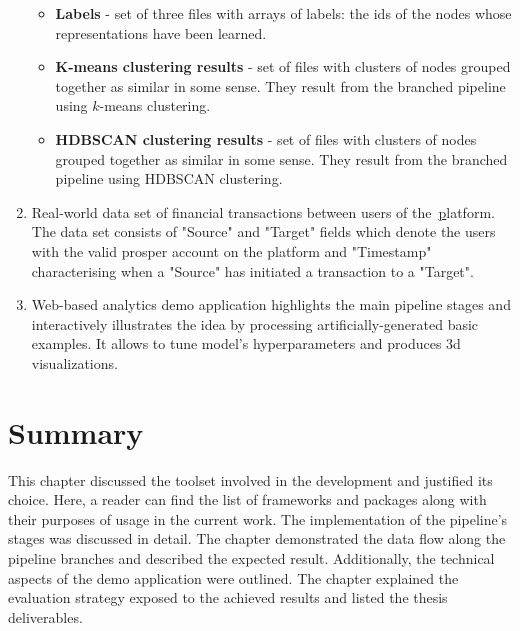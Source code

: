 \begin{enumerate}
\begin{itemize}
        \item \textbf{Labels} - set of three files with arrays of labels: the ids of the nodes whose representations have been learned.
        \item \textbf{K-means clustering results} - set of files with clusters of nodes grouped together as similar in some sense. They result from the branched pipeline using $k$-means clustering.
        \item \textbf{HDBSCAN clustering results} - set of files with clusters of nodes grouped together as similar in some sense. They result from the branched pipeline using HDBSCAN clustering.
    \end{itemize}
    \item Real-world data set of financial transactions between users of the~\href{www.prosper.com} platform. The data set consists of "Source" and "Target" fields which denote the users with the valid prosper account on the platform and "Timestamp" characterising when a "Source" has initiated a transaction to a "Target".
    \item Web-based analytics demo application highlights the main pipeline stages and interactively illustrates the idea by processing artificially-generated basic examples. It allows to tune model's hyperparameters and produces 3d visualizations.
\end{enumerate}

\section{Summary}
This chapter discussed the toolset involved in the development and justified its choice. Here, a reader can find the list of frameworks and packages along with their purposes of usage in the current work. The implementation of the pipeline's stages was discussed in detail. The chapter demonstrated the data flow along the pipeline branches and described the expected result. Additionally, the technical aspects of the demo application were outlined. The chapter explained the evaluation strategy exposed to the achieved results and listed the thesis deliverables.
